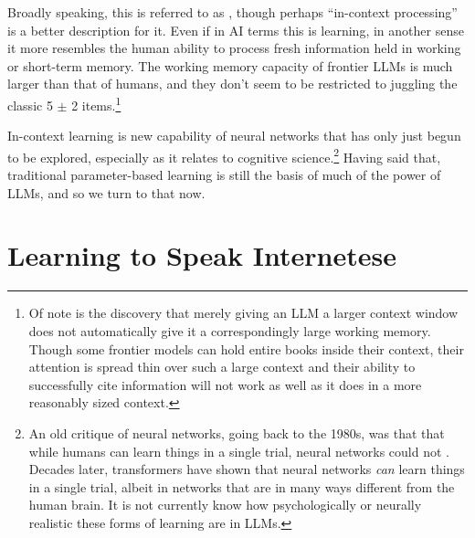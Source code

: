 Broadly speaking, this is referred to as , though
perhaps ``in-context processing'' is a better description for it. Even if in AI
terms this is learning, in another sense it more resembles the human ability to
process fresh information held in working or short-term memory. The working
memory capacity of frontier LLMs is much larger than that of humans, and they
don't seem to be restricted to juggling the classic 5 $\pm$ 2
items.\footnote{Of note is the discovery that merely giving an LLM a larger
context window does not automatically give it a correspondingly large working
memory. Though some frontier models can hold entire books inside their context,
their attention is spread thin over such a large context and their ability to
successfully cite information will not work as well as it does in a more
reasonably sized context.}

In-context learning is new capability of neural networks that has only just begun to
be explored, especially as it relates to cognitive science.\footnote{An old critique of neural networks, going back to the 1980s, was that that while humans can learn things in a single trial, neural networks could not \cite{schneider1988structure}. Decades later, transformers have shown that neural networks \emph{can} learn things in a single trial, albeit in networks that are in many ways different from the human brain. It is not currently know how psychologically or neurally realistic these forms of learning are in LLMs.} Having said that,
traditional parameter-based learning is still the basis of much of the power of
LLMs, and so we turn to that now.

\section{Learning to Speak Internetese}\label{internetese}

